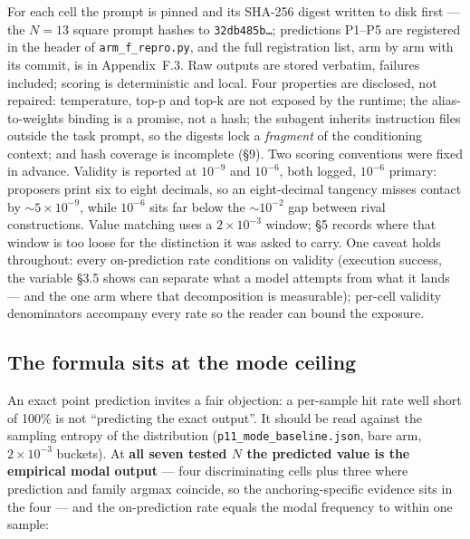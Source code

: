 For each cell the prompt is pinned and its SHA-256 digest written to disk first --- the $N = 13$
square prompt hashes to \texttt{32db485b\ldots}; predictions P1--P5 are registered in the header of
\texttt{arm\_f\_repro.py}, and the full registration list, arm by arm with its commit, is in
Appendix~F.3. Raw outputs are stored verbatim, failures included; scoring is deterministic and
local. Four properties are disclosed, not repaired: temperature, top-p and top-k are not exposed by
the runtime; the alias-to-weights binding is a promise, not a hash; the subagent inherits
instruction files outside the task prompt, so the digests lock a \emph{fragment} of the
conditioning context; and hash coverage is incomplete (\S9). Two scoring conventions were fixed in
advance. Validity is reported at $10^{-9}$ and $10^{-6}$, both logged, $10^{-6}$ primary: proposers
print six to eight decimals, so an eight-decimal tangency misses contact by $\sim$$5\times10^{-9}$,
while $10^{-6}$ sits far below the $\sim$$10^{-2}$ gap between rival constructions. Value matching
uses a $2\times10^{-3}$ window; \S5 records where that window is too loose for the distinction it
was asked to carry.
One caveat holds throughout: every on-prediction rate conditions on validity (execution success,
the variable \S3.5 shows can separate what a model attempts from what it lands --- and the one
arm where that decomposition is measurable); per-cell validity denominators accompany every rate
so the reader can bound the exposure.

\subsection{The formula sits at the mode ceiling}

An exact point prediction invites a fair objection: a per-sample hit rate well short of 100\% is
not ``predicting the exact output''. It should be read against the sampling entropy of the
distribution (\texttt{p11\_mode\_baseline.json}, bare arm, $2\times10^{-3}$ buckets). At \textbf{all
seven tested $N$ the predicted value is the empirical modal output} --- four discriminating cells
plus three where prediction and family argmax coincide, so the anchoring-specific evidence sits in
the four --- and the on-prediction rate equals the modal frequency to within one sample:

